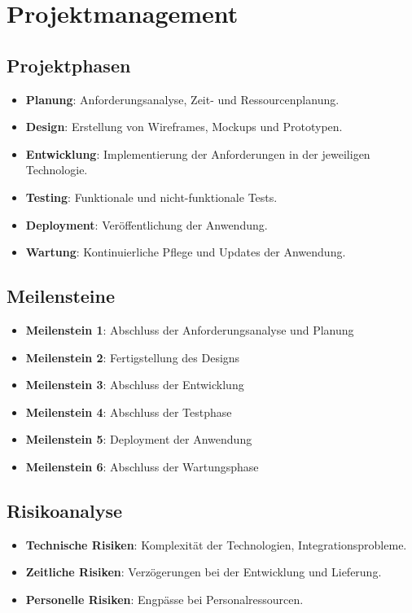 \documentclass[a4paper,12pt]{article}
\begin{document}
\section{Projektmanagement}

\subsection{Projektphasen}
\begin{itemize}
    \item \textbf{Planung}: Anforderungsanalyse, Zeit- und Ressourcenplanung.
    \item \textbf{Design}: Erstellung von Wireframes, Mockups und Prototypen.
    \item \textbf{Entwicklung}: Implementierung der Anforderungen in der jeweiligen Technologie.
    \item \textbf{Testing}: Funktionale und nicht-funktionale Tests.
    \item \textbf{Deployment}: Veröffentlichung der Anwendung.
    \item \textbf{Wartung}: Kontinuierliche Pflege und Updates der Anwendung.
\end{itemize}

\subsection{Meilensteine}
\begin{itemize}
    \item \textbf{Meilenstein 1}: Abschluss der Anforderungsanalyse und Planung
    \item \textbf{Meilenstein 2}: Fertigstellung des Designs
    \item \textbf{Meilenstein 3}: Abschluss der Entwicklung
    \item \textbf{Meilenstein 4}: Abschluss der Testphase
    \item \textbf{Meilenstein 5}: Deployment der Anwendung
    \item \textbf{Meilenstein 6}: Abschluss der Wartungsphase
\end{itemize}

\subsection{Risikoanalyse}
\begin{itemize}
    \item \textbf{Technische Risiken}: Komplexität der Technologien, Integrationsprobleme.
    \item \textbf{Zeitliche Risiken}: Verzögerungen bei der Entwicklung und Lieferung.
    \item \textbf{Personelle Risiken}: Engpässe bei Personalressourcen.
\end{itemize}
\end{document}
